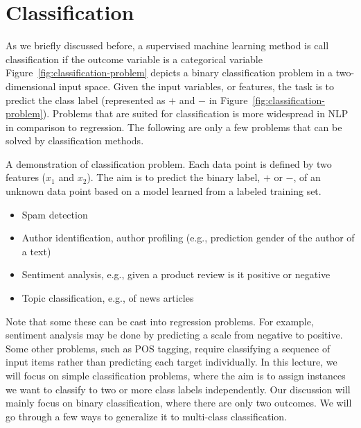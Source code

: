 \chapter{\label{chap:classification}Classification}

As we briefly discussed before,
a supervised machine learning method is call classification
if the outcome variable is a categorical variable
Figure~\ref{fig:classification-problem} depicts
a binary classification problem in a two-dimensional input space.
Given the input variables, or features,
the task is to predict the class label
(represented as $+$ and $-$ in Figure~\ref{fig:classification-problem}).
Problems that are suited for classification is more widespread
in NLP in comparison to regression.
The following are only a few problems
that can be solved by classification methods.
\begin{marginfigure}
  \caption{\label{fig:classification-problem}
    A demonstration of classification problem.
    Each data point is defined by two features ($x_{1}$ and $x_{2}$).
    The aim is to predict the binary label, $+$ or $-$,
    of an unknown data point based on a model learned from
    a labeled training set.}
\end{marginfigure}
\begin{itemize}
  \item Spam detection
  \item Author identification,
    author profiling (e.g., prediction gender of the author of a text)
  \item Sentiment analysis,
    e.g., given a product review is it positive or negative
  \item Topic classification, e.g., of news articles
\end{itemize}
Note that some these can be cast into regression problems.
For example,
sentiment analysis may be done by predicting a scale from negative to positive.
Some other problems,
such as POS tagging,
require classifying
a sequence of input items rather than predicting each target individually.
In this lecture,
we will focus on simple classification problems,
where the aim is to assign instances we want to classify
to two or more class labels independently.%
Our discussion will mainly focus on binary classification,
where there are only two outcomes.
We will go through a few ways to generalize it to multi-class classification.

